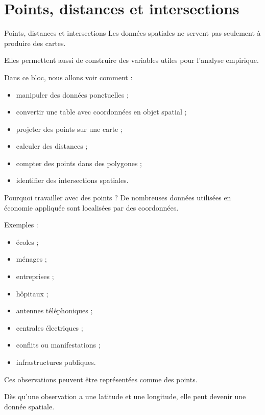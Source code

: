\documentclass[
  10pt,
  ignorenonframetext,
]{beamer}
\begin{document}
\section{Points, distances et
intersections}\label{points-distances-et-intersections}

\begin{frame}{Points, distances et intersections}
\label{points-distances-et-intersections-1}
Les données spatiales ne servent pas seulement à produire des cartes.

Elles permettent aussi de construire des variables utiles pour l'analyse
empirique.

Dans ce bloc, nous allons voir comment :

\begin{itemize}
  \item manipuler des données ponctuelles ;
  \item convertir une table avec coordonnées en objet spatial ;
  \item projeter des points sur une carte ;
  \item calculer des distances ;
  \item compter des points dans des polygones ;
  \item identifier des intersections spatiales.
\end{itemize}
\end{frame}

\begin{frame}{Pourquoi travailler avec des points ?}
\label{pourquoi-travailler-avec-des-points}
De nombreuses données utilisées en économie appliquée sont localisées
par des coordonnées.

Exemples :

\begin{itemize}
  \item écoles ;
  \item ménages ;
  \item entreprises ;
  \item hôpitaux ;
  \item antennes téléphoniques ;
  \item centrales électriques ;
  \item conflits ou manifestations ;
  \item infrastructures publiques.
\end{itemize}

Ces observations peuvent être représentées comme des points.

Dès qu'une observation a une latitude et une longitude, elle peut
devenir une donnée spatiale.
\end{frame}
\end{document}
